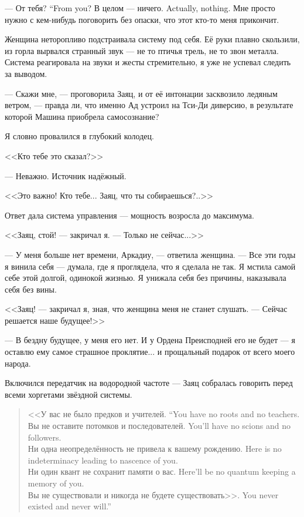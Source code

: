 {--- От тебя?}
{``From you?}
{В целом --- ничего.}
{Actually, nothing.}
Мне просто нужно с кем-нибудь поговорить без опаски, что этот кто-то меня прикончит.

Женщина неторопливо подстраивала систему под себя.
Её руки плавно скользили, из горла вырвался странный звук --- не то птичья трель, не то звон металла.
Система реагировала на звуки и жесты стремительно, я уже не успевал следить за выводом.

--- Скажи мне, --- проговорила Заяц, и от её интонации засквозило ледяным ветром, --- правда ли, что именно Ад устроил на Тси-Ди диверсию, в результате которой Машина приобрела самосознание?

Я словно провалился в глубокий колодец.

<<Кто тебе это сказал?>>

--- Неважно.
Источник надёжный.

<<Это важно!
Кто тебе...
Заяц, что ты собираешься?..>>

Ответ дала система управления --- мощность возросла до максимума.

<<Заяц, стой! --- закричал я.
--- Только не сейчас...>>

--- У меня больше нет времени, Аркадиу, --- ответила женщина.
--- Все эти годы я винила себя --- думала, где я проглядела, что я сделала не так.
Я мстила самой себе этой долгой, одинокой жизнью.
Я унижала себя без причины, наказывала себя без вины.

<<Заяц! --- закричал я, зная, что женщина меня не станет слушать.
--- Сейчас решается наше будущее!>>

---  В бездну будущее, у меня его нет.
И у Ордена Преисподней его не будет --- я оставлю ему самое страшное проклятие... и прощальный подарок от всего моего народа.

Включился передатчик на водородной частоте --- Заяц собралась говорить перед всеми хоргетами звёздной системы.

\begin{quote}
{<<У вас не было предков и учителей.}
{``You have no roots and no teachers.}\\
{Вы не оставите потомков и последователей.}
{You'll have no scions and no followers.}\\
{Ни одна неопределённость не привела к вашему рождению.}
{Here is no indeterminacy leading to nascence of you.}\\
{Ни один квант не сохранит памяти о вас.}
{Here'll be no quantum keeping a memory of you.}\\
{Вы не существовали и никогда не будете существовать>>.}
{You never existed and never will.''}
\end{quote}

